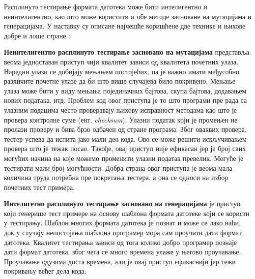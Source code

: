 \documentclass[12pt,oneside]{memoir}
\begin{document}
Расплинуто тестирање формата датотека може бити интелигентно и неинтелигентно, као што може користити и обе методе засноване на мутацијама и генерацијама. У наставку су описане најчешће коришћене две технике и њихове добре и лоше стране \cite{fuzzingBrute}: 
\begin{description}
\item \textbf{Неинтелигентно расплинуто тестирање засновано на мутацијама} представља веома једноставан приступ чији квалитет зависи од квалитета почетних улаза. Наредни улази се добијају мењањем постојећих, па је важно имати међусобно различите почетне улазе да би што више случајева било покривено. Мењање улаза може бити у виду мењања појединачних бајтова, скупа бајтова, додавањем нових података, итд. Проблем код овог приступа је то што програми пре рада са улазним подацима често проверавају њихову исправност методама као што је провера контролне суме (енг. \textit{checksum}). Улазни податак који је промењен не пролази проверу и бива брзо одбачен од стране програма. Због оваквих провера, тестер успева да испита јако мали део кода. Ово се може решити искључивањем провера што је тежак посао. Такође, овај приступ није ефикасан јер је број свих могућих начина на које можемо променити улазни податак превелик. Могуће је тестирати мали број могућности. Добра страна овог приступа је веома мала количина труда потребна пре покретања тестера, а она се односи на избор почетних тест примера. 
\item \textbf{Интелигетно расплинуто тестирање засновано на генерацијама} је приступ који генерише тест примере на основу шаблона формата датотеке који се користи у тестирању. Шаблон многих формата датотека је познат и може се лако наћи, док у случају непостојања шаблона програмер мора сам проучити дати формат датотека. Квалитет тестирања зависи од тога колико добро програмер познаје дати формат датотека, због чега се много времена улаже у његово проучавање. Проучавање одузима доста времена, али је овај приступ ефикаснији јер тежи покривању већег дела кода.
\end{description}
\end{document}
